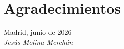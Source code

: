 \cleardoublepage

\chapter*{Agradecimientos}


\begin{flushright}
\vspace{4.0 cm}
Madrid, junio de 2026\\
\emph{Jesús Molina Merchán}
\end{flushright}

\thispagestyle{empty}
